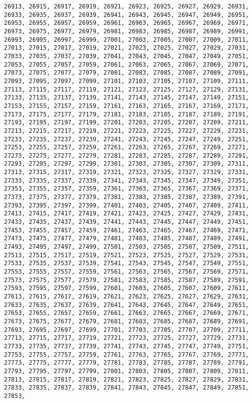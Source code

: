 \documentclass[11pt]{article}
\begin{document}
\begin{Verbatim}[commandchars=\\\{\}]
26913, 26915, 26917, 26919, 26921, 26923, 26925, 26927, 26929, 26931, 26933, 26935, 26937, 26939, 26941, 26943, 26945, 26947, 26949, 26951, 26953, 26955, 26957, 26959, 26961, 26963, 26965, 26967, 26969, 26971, 26973, 26975, 26977, 26979, 26981, 26983, 26985, 26987, 26989, 26991, 26993, 26995, 26997, 26999, 27001, 27003, 27005, 27007, 27009, 27011, 27013, 27015, 27017, 27019, 27021, 27023, 27025, 27027, 27029, 27031, 27033, 27035, 27037, 27039, 27041, 27043, 27045, 27047, 27049, 27051, 27053, 27055, 27057, 27059, 27061, 27063, 27065, 27067, 27069, 27071, 27073, 27075, 27077, 27079, 27081, 27083, 27085, 27087, 27089, 27091, 27093, 27095, 27097, 27099, 27101, 27103, 27105, 27107, 27109, 27111, 27113, 27115, 27117, 27119, 27121, 27123, 27125, 27127, 27129, 27131, 27133, 27135, 27137, 27139, 27141, 27143, 27145, 27147, 27149, 27151, 27153, 27155, 27157, 27159, 27161, 27163, 27165, 27167, 27169, 27171, 27173, 27175, 27177, 27179, 27181, 27183, 27185, 27187, 27189, 27191, 27193, 27195, 27197, 27199, 27201, 27203, 27205, 27207, 27209, 27211, 27213, 27215, 27217, 27219, 27221, 27223, 27225, 27227, 27229, 27231, 27233, 27235, 27237, 27239, 27241, 27243, 27245, 27247, 27249, 27251, 27253, 27255, 27257, 27259, 27261, 27263, 27265, 27267, 27269, 27271, 27273, 27275, 27277, 27279, 27281, 27283, 27285, 27287, 27289, 27291, 27293, 27295, 27297, 27299, 27301, 27303, 27305, 27307, 27309, 27311, 27313, 27315, 27317, 27319, 27321, 27323, 27325, 27327, 27329, 27331, 27333, 27335, 27337, 27339, 27341, 27343, 27345, 27347, 27349, 27351, 27353, 27355, 27357, 27359, 27361, 27363, 27365, 27367, 27369, 27371, 27373, 27375, 27377, 27379, 27381, 27383, 27385, 27387, 27389, 27391, 27393, 27395, 27397, 27399, 27401, 27403, 27405, 27407, 27409, 27411, 27413, 27415, 27417, 27419, 27421, 27423, 27425, 27427, 27429, 27431, 27433, 27435, 27437, 27439, 27441, 27443, 27445, 27447, 27449, 27451, 27453, 27455, 27457, 27459, 27461, 27463, 27465, 27467, 27469, 27471, 27473, 27475, 27477, 27479, 27481, 27483, 27485, 27487, 27489, 27491, 27493, 27495, 27497, 27499, 27501, 27503, 27505, 27507, 27509, 27511, 27513, 27515, 27517, 27519, 27521, 27523, 27525, 27527, 27529, 27531, 27533, 27535, 27537, 27539, 27541, 27543, 27545, 27547, 27549, 27551, 27553, 27555, 27557, 27559, 27561, 27563, 27565, 27567, 27569, 27571, 27573, 27575, 27577, 27579, 27581, 27583, 27585, 27587, 27589, 27591, 27593, 27595, 27597, 27599, 27601, 27603, 27605, 27607, 27609, 27611, 27613, 27615, 27617, 27619, 27621, 27623, 27625, 27627, 27629, 27631, 27633, 27635, 27637, 27639, 27641, 27643, 27645, 27647, 27649, 27651, 27653, 27655, 27657, 27659, 27661, 27663, 27665, 27667, 27669, 27671, 27673, 27675, 27677, 27679, 27681, 27683, 27685, 27687, 27689, 27691, 27693, 27695, 27697, 27699, 27701, 27703, 27705, 27707, 27709, 27711, 27713, 27715, 27717, 27719, 27721, 27723, 27725, 27727, 27729, 27731, 27733, 27735, 27737, 27739, 27741, 27743, 27745, 27747, 27749, 27751, 27753, 27755, 27757, 27759, 27761, 27763, 27765, 27767, 27769, 27771, 27773, 27775, 27777, 27779, 27781, 27783, 27785, 27787, 27789, 27791, 27793, 27795, 27797, 27799, 27801, 27803, 27805, 27807, 27809, 27811, 27813, 27815, 27817, 27819, 27821, 27823, 27825, 27827, 27829, 27831, 27833, 27835, 27837, 27839, 27841, 27843, 27845, 27847, 27849, 27851, 27853, 
\end{Verbatim}
\end{document}
